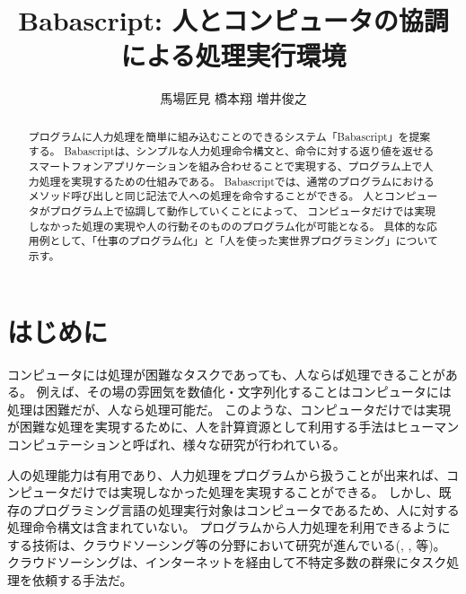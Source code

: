 \documentclass[twoside]{wiss}
\begin{document}
\title{Babascript: 人とコンピュータの協調による処理実行環境}
\etitle{} %

\author{{馬場匠見} \hspace{1em}
        {橋本翔} \hspace{1em}
        {増井俊之
        }
        }

\begin{abstract}
プログラムに人力処理を簡単に組み込むことのできるシステム「Babascript」を提案する。
Babascriptは、シンプルな人力処理命令構文と、命令に対する返り値を返せるスマートフォンアプリケーションを組み合わせることで実現する、プログラム上で人力処理を実現するための仕組みである。
Babascriptでは、通常のプログラムにおけるメソッド呼び出しと同じ記法で人への処理を命令することができる。
人とコンピュータがプログラム上で協調して動作していくことによって、
コンピュータだけでは実現しなかった処理の実現や人の行動そのもののプログラム化が可能となる。
具体的な応用例として、「仕事のプログラム化」と「人を使った実世界プログラミング」について示す。
\end{abstract}

\maketitle

\section{はじめに}
コンピュータには処理が困難なタスクであっても、人ならば処理できることがある。
例えば、その場の雰囲気を数値化・文字列化することはコンピュータには処理は困難だが、人なら処理可能だ。
このような、コンピュータだけでは実現が困難な処理を実現するために、人を計算資源として利用する手法はヒューマンコンピュテーション\cite{humancomputation}と呼ばれ、様々な研究が行われている。

人の処理能力は有用であり、人力処理をプログラムから扱うことが出来れば、コンピュータだけでは実現しなかった処理を実現することができる。
しかし、既存のプログラミング言語の処理実行対象はコンピュータであるため、人に対する処理命令構文は含まれていない。
プログラムから人力処理を利用できるようにする技術は、クラウドソーシング等の分野において研究が進んでいる(\cite{automan}, \cite{crowddb}, \cite{crowdforge}等)。
クラウドソーシングは、インターネットを経由して不特定多数の群衆にタスク処理を依頼する手法だ\cite{riseofcrowdsourcing}。
\end{document}
